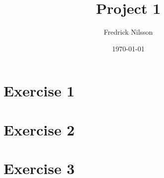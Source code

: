\documentclass[12pt]{article}
\title{Project 1}
\author{Fredrick Nilsson}
\date{\today}
\begin{document}
\maketitle

\tableofcontents

\newpage

\section*{Exercise 1}

\newpage

\section*{Exercise 2}

\newpage

\section*{Exercise 3}
\end{document}
